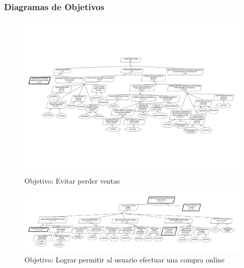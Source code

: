 \subsubsection{Diagramas de Objetivos}
\begin{figure}[H]
  \begin{center}
  \includegraphics[angle=90,height=\textheight]{images/objetivos-raiz.pdf}
  \caption{Objetivo: Evitar perder ventas}
  \end{center}
\end{figure}

\newpage
\begin{figure}[H]
  \begin{center}
  \includegraphics[angle=90,height=\textheight]{images/objetivos-operacion-online.pdf}
  \caption{Objetivo: Lograr permitir al usuario efectuar una compra online}
  \end{center}
\end{figure}


